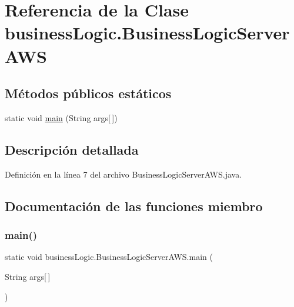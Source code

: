 \hypertarget{classbusinessLogic_1_1BusinessLogicServerAWS}{}\section{Referencia de la Clase business\+Logic.\+Business\+Logic\+Server\+A\+WS}
\label{classbusinessLogic_1_1BusinessLogicServerAWS}
\subsection*{Métodos públicos estáticos}
\begin{DoxyCompactItemize}
\item 
static void \mbox{\hyperlink{classbusinessLogic_1_1BusinessLogicServerAWS_a1a3efa4578ccdced4b0668444e71e9ad}{main}} (String args\mbox{[}$\,$\mbox{]})
\end{DoxyCompactItemize}


\subsection{Descripción detallada}


Definición en la línea 7 del archivo Business\+Logic\+Server\+A\+W\+S.\+java.



\subsection{Documentación de las funciones miembro}
\mbox{\label{classbusinessLogic_1_1BusinessLogicServerAWS_a1a3efa4578ccdced4b0668444e71e9ad}} 
\subsubsection{\texorpdfstring{main()}{main()}}
{\footnotesize\ttfamily static void business\+Logic.\+Business\+Logic\+Server\+A\+W\+S.\+main (\begin{DoxyParamCaption}\item[{String}]{args\mbox{[}$\,$\mbox{]} }\end{DoxyParamCaption})\hspace{0.3cm}{\ttfamily [static]}}



